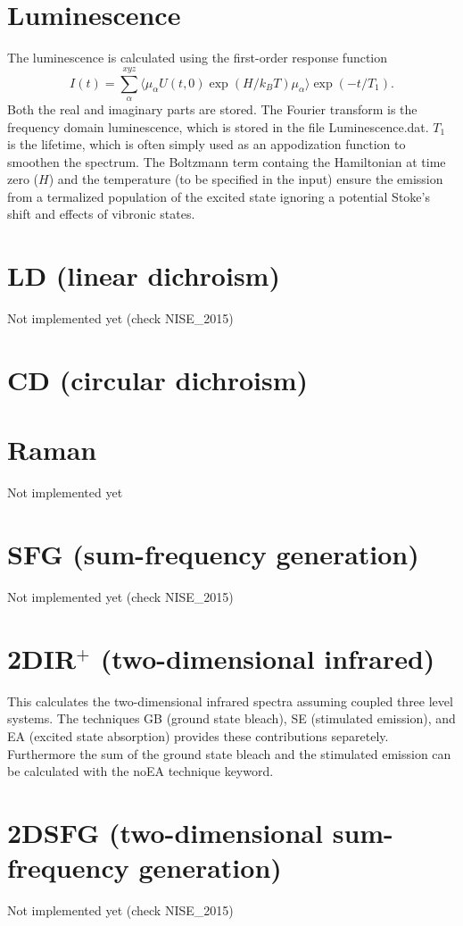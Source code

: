 \section{Luminescence}
The luminescence is calculated using the first-order response function
\begin{equation}
I(t)=\sum_{\alpha}^{xyz}\langle\mu_{\alpha}U(t,0)\exp(H/k_BT)\mu_{\alpha}\rangle\exp(-t/T_1).
\end{equation}
Both the real and imaginary parts are stored. The Fourier transform is the frequency domain luminescence, which is stored in the file Luminescence.dat. $T_1$ is the lifetime, which is often simply used as an appodization function to smoothen the spectrum. The Boltzmann term containg the Hamiltonian at time zero ($H$) and the temperature (to be specified in the input) ensure the emission from a termalized population of the excited state ignoring a potential Stoke's shift and effects of vibronic states. 
\section{LD (linear dichroism)}
Not implemented yet (check NISE\_2015)
\section{CD (circular dichroism)}
\section{Raman}
Not implemented yet
\section{SFG (sum-frequency generation)}
Not implemented yet (check NISE\_2015)
\section{2DIR$^{+}$ (two-dimensional infrared)}
This calculates the two-dimensional infrared spectra assuming coupled three level systems. The techniques GB (ground state bleach), SE (stimulated emission), and EA (excited state absorption) provides these contributions separetely. Furthermore the sum of the ground state bleach and the stimulated emission can be calculated with the noEA technique keyword. 
\section{2DSFG (two-dimensional sum-frequency generation)}
 Not implemented yet (check NISE\_2015)
